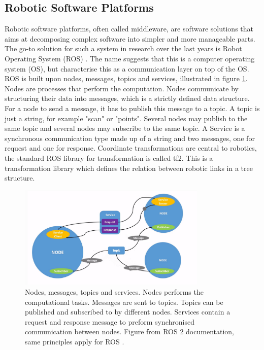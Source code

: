 \subsection{Robotic Software Platforms} \label{sec:RS:RoboticSooftwarePlatforms}
Robotic software platforms, often called middleware, are software solutions that aims at decomposing complex software into simpler and more manageable parts. The go-to solution for such a system in research over the last years is Robot Operating System (ROS) \cite{QuigleyROS}. The name suggests that this is a computer operating system (OS), but \cite{QuigleyROS} characterise this as a communication layer on top of the OS. ROS is built upon nodes, messages, topics and services, illustrated in figure \ref{fig:T:RC:Nodes}. Nodes are processes that perform the computation. Nodes communicate by structuring their data into messages, which is a strictly defined data structure. For a node to send a message, it has to publish this message to a topic. A topic is just a string, for example "scan" or "points". Several nodes may publish to the same topic and several nodes may subscribe to the same topic. A Service is a synchronous communication type made up of a string and two messages, one for request and one for response. Coordinate transformations are central to robotics, the standard ROS library for transformation is called tf2. This is a transformation library which defines the relation between robotic links in a tree structure\cite{ROStf2}.

\begin{figure}[htp]
  \centering
  \includegraphics[width = 0.8\textwidth]{Figures/figROSConcept.pdf}
  \caption{Nodes, messages, topics and services. Nodes performs the computational tasks. Messages are sent to topics. Topics can be published and subscribed to by different nodes. Services contain a request and response message to preform synchronised communication between nodes. Figure from ROS 2 documentation, same principles apply for ROS \cite{ROS2Nodes}.}
  \label{fig:T:RC:Nodes}
\end{figure}

